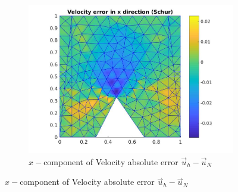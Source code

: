 \documentclass[graybox]{svmult}
\begin{document}
\begin{figure}[H]
\begin{subfigure}{0.31\textwidth}
\includegraphics[width=\linewidth]{velocity_error_1_at_47_33.jpg}
\caption{$x-$component of Velocity absolute error $\overrightarrow{u}_h-\overrightarrow{u}_N$} \label{error_x_vel}
\end{subfigure}


\end{figure}
\end{document}
